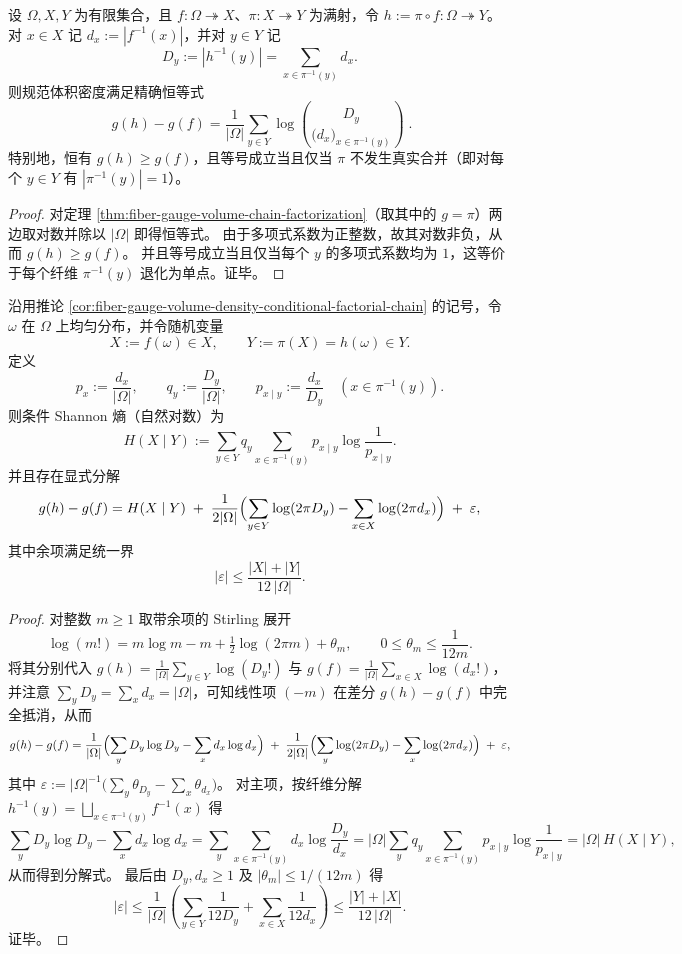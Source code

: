 \begin{corollary}[规范体积密度的条件阶乘链式律]\label{cor:fiber-gauge-volume-density-conditional-factorial-chain}
设 \(\Omega,X,Y\) 为有限集合，且 \(f:\Omega\twoheadrightarrow X\)、\(\pi:X\twoheadrightarrow Y\) 为满射，令 \(h:=\pi\circ f:\Omega\twoheadrightarrow Y\)。
对 \(x\in X\) 记 \(d_x:=|f^{-1}(x)|\)，并对 \(y\in Y\) 记
\[
D_y:=|h^{-1}(y)|=\sum_{x\in\pi^{-1}(y)}d_x.
\]
则规范体积密度满足精确恒等式
\[
\boxed{\;
g(h)-g(f)
=\frac{1}{|\Omega|}\sum_{y\in Y}\log\binom{D_y}{\bigl(d_x\bigr)_{x\in\pi^{-1}(y)}}\; }.
\]
特别地，恒有 \(g(h)\ge g(f)\)，且等号成立当且仅当 \(\pi\) 不发生真实合并（即对每个 \(y\in Y\) 有 \(|\pi^{-1}(y)|=1\)）。
\end{corollary}
\begin{proof}
对定理 \ref{thm:fiber-gauge-volume-chain-factorization}（取其中的 \(g=\pi\)）两边取对数并除以 \(|\Omega|\) 即得恒等式。
由于多项式系数为正整数，故其对数非负，从而 \(g(h)\ge g(f)\)。
并且等号成立当且仅当每个 \(y\) 的多项式系数均为 \(1\)，这等价于每个纤维 \(\pi^{-1}(y)\) 退化为单点。证毕。
\end{proof}

\begin{proposition}\label{prop:fiber-gauge-volume-increment-conditional-shannon-stirling}
沿用推论 \ref{cor:fiber-gauge-volume-density-conditional-factorial-chain} 的记号，令 \(\omega\) 在 \(\Omega\) 上均匀分布，并令随机变量
\[
X:=f(\omega)\in X,\qquad Y:=\pi(X)=h(\omega)\in Y.
\]
定义
\[
p_x:=\frac{d_x}{|\Omega|},\qquad
q_y:=\frac{D_y}{|\Omega|},\qquad
p_{x\mid y}:=\frac{d_x}{D_y}\quad(x\in\pi^{-1}(y)).
\]
则条件 Shannon 熵（自然对数）为
\[
H(X\mid Y):=\sum_{y\in Y}q_y\sum_{x\in\pi^{-1}(y)}p_{x\mid y}\log\frac{1}{p_{x\mid y}}.
\]
并且存在显式分解
\[
g(h)-g(f)
=H(X\mid Y)
\;+\;\frac{1}{2|\Omega|}\Bigl(\sum_{y\in Y}\log(2\pi D_y)-\sum_{x\in X}\log(2\pi d_x)\Bigr)
\;+\;\varepsilon,
\]
其中余项满足统一界
\[
|\varepsilon|\le \frac{|X|+|Y|}{12\,|\Omega|}.
\]
\end{proposition}
\begin{proof}
对整数 \(m\ge 1\) 取带余项的 Stirling 展开
\[
\log(m!)=m\log m-m+\tfrac12\log(2\pi m)+\theta_m,
\qquad
0\le \theta_m\le \frac{1}{12m}.
\]
将其分别代入
\(
g(h)=\frac{1}{|\Omega|}\sum_{y\in Y}\log(D_y!)
\)
与
\(
g(f)=\frac{1}{|\Omega|}\sum_{x\in X}\log(d_x!)
\)，
并注意 \(\sum_{y}D_y=\sum_x d_x=|\Omega|\)，可知线性项 \((-m)\) 在差分 \(g(h)-g(f)\) 中完全抵消，从而
\[
g(h)-g(f)
=\frac{1}{|\Omega|}\Bigl(\sum_{y}D_y\log D_y-\sum_x d_x\log d_x\Bigr)
\;+\;\frac{1}{2|\Omega|}\Bigl(\sum_{y}\log(2\pi D_y)-\sum_x\log(2\pi d_x)\Bigr)
\;+\;\varepsilon,
\]
其中
\(
\varepsilon:=|\Omega|^{-1}\bigl(\sum_y\theta_{D_y}-\sum_x\theta_{d_x}\bigr)
\)。
对主项，按纤维分解 \(h^{-1}(y)=\bigsqcup_{x\in\pi^{-1}(y)}f^{-1}(x)\) 得
\[
\sum_{y}D_y\log D_y-\sum_x d_x\log d_x
=\sum_{y}\sum_{x\in\pi^{-1}(y)}d_x\log\frac{D_y}{d_x}
=|\Omega|\sum_{y}q_y\sum_{x\in\pi^{-1}(y)}p_{x\mid y}\log\frac{1}{p_{x\mid y}}
=|\Omega|\,H(X\mid Y),
\]
从而得到分解式。
最后由 \(D_y,d_x\ge 1\) 及 \(|\theta_m|\le 1/(12m)\) 得
\[
|\varepsilon|
\le
\frac{1}{|\Omega|}\left(\sum_{y\in Y}\frac{1}{12D_y}+\sum_{x\in X}\frac{1}{12d_x}\right)
\le
\frac{|Y|+|X|}{12\,|\Omega|}.
\]
证毕。
\end{proof}


